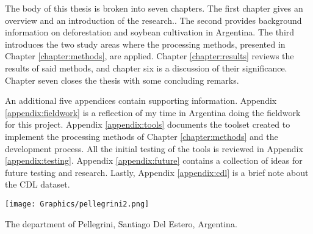 The body of this thesis is broken into seven chapters. The first chapter gives an overview and an introduction of the research.. The second provides background information on deforestation and soybean cultivation in Argentina. The third introduces the two study areas where the processing methods, presented in Chapter \ref{chapter:methods}, are applied. Chapter \ref{chapter:results} reviews the results of said methods, and chapter six is a discussion of their significance. Chapter seven closes the thesis with some concluding remarks.

An additional five appendices contain supporting information. Appendix \ref{appendix:fieldwork} is a reflection of my time in Argentina doing the fieldwork for this project. Appendix \ref{appendix:tools} documents the toolset created to implement the processing methods of Chapter \ref{chapter:methods} and the development process. All the initial testing of the tools is reviewed in Appendix \ref{appendix:testing}. Appendix \ref{appendix:future} contains a collection of ideas for future testing and research. Lastly, Appendix \ref{appendix:cdl} is a brief note about the CDL dataset.

\begin{ssfigure}
  \centering
  \texttt{[image: Graphics/pellegrini2.png]}
  \caption{The department of Pellegrini, Santiago Del Estero, Argentina.}
  \label{fig:pellegrini}
\end{ssfigure}